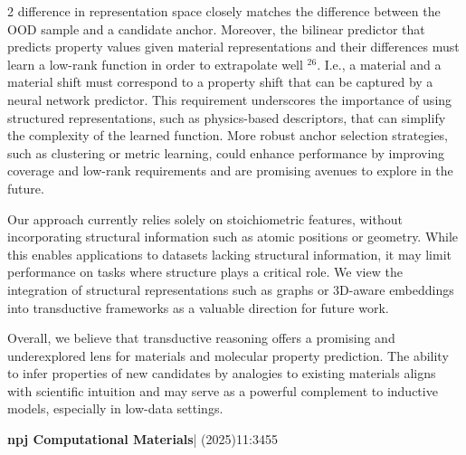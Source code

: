\documentclass[10pt]{article}
\begin{document}
\begin{multicols}{2}
difference in representation space closely matches the difference between the OOD sample and a candidate anchor. Moreover, the bilinear predictor that predicts property values given material representations and their differences must learn a low-rank function in order to extrapolate well $^{26}$. I.e., a material and a material shift must correspond to a property shift that can be captured by a neural network predictor. This requirement underscores the importance of using structured representations, such as physics-based descriptors, that can simplify the complexity of the learned function. More robust anchor selection strategies, such as clustering or metric learning, could enhance performance by improving coverage and low-rank requirements and are promising avenues to explore in the future.

Our approach currently relies solely on stoichiometric features, without incorporating structural information such as atomic positions or geometry. While this enables applications to datasets lacking structural information, it may limit performance on tasks where structure plays a critical role. We view the integration of structural representations such as graphs or 3D-aware embeddings into transductive frameworks as a valuable direction for future work.

Overall, we believe that transductive reasoning offers a promising and underexplored lens for materials and molecular property prediction. The ability to infer properties of new candidates by analogies to existing materials aligns with scientific intuition and may serve as a powerful complement to inductive models, especially in low-data settings.
\end{multicols}

\vfill
{\color{cyan!50!black}\footnotesize\textbf{npj Computational Materials}}{\footnotesize| (2025)11:345}\hfill{\footnotesize 5}
\end{document}
